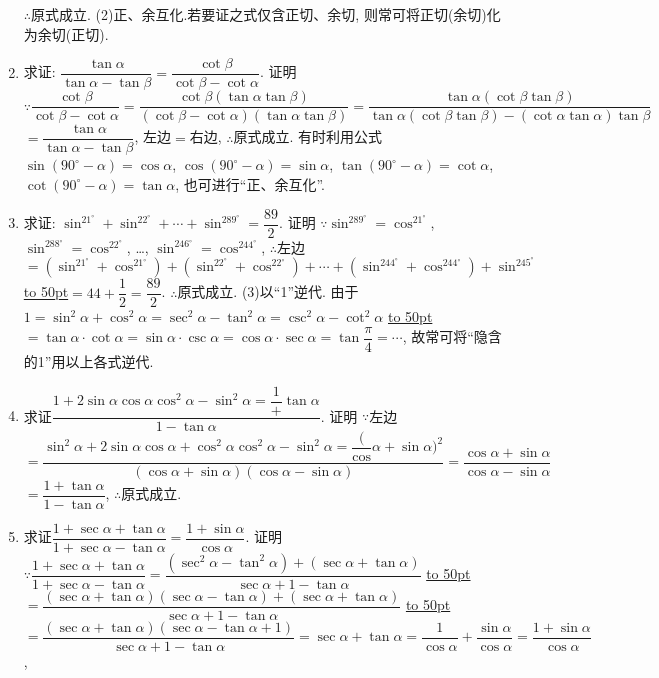 \documentclass[10pt,a4paper]{article}
\newcommand{\blank}[1]{\underline{\hbox to #1pt{}}}
\begin{document}
\begin{enumerate}[1.]
$\therefore$原式成立.
(2)正、余互化.若要证之式仅含正切、余切, 则常可将正切(余切)化为余切(正切).
\item 求证: $\dfrac{\tan \alpha }{\tan \alpha -\tan \beta }=\dfrac{\cot \beta }{\cot \beta -\cot \alpha }$.
证明  $\because \dfrac{\cot \beta }{\cot \beta -\cot \alpha }=\dfrac{\cot \beta (\tan \alpha \tan \beta)}{(\cot \beta -\cot \alpha)(\tan \alpha \tan \beta)}=\dfrac{\tan \alpha (\cot \beta \tan \beta)}{\tan \alpha (\cot \beta \tan \beta)-(\cot \alpha \tan \alpha)\tan \beta }$
$=\dfrac{\tan \alpha }{\tan \alpha -\tan \beta }$, 左边$=$右边,
$\therefore$原式成立.
有时利用公式$\sin (90^\circ -\alpha)=\cos \alpha$, $\cos (90^\circ -\alpha)=\sin \alpha$, $\tan (90^\circ -\alpha)=\cot \alpha$, $\cot (90^\circ -\alpha)=\tan \alpha$, 也可进行``正、余互化''.
\item 求证: $\sin ^21^\circ +\sin ^22^\circ +\cdots +\sin ^289^\circ =\dfrac{89}2$.
证明  $\because \sin ^289^\circ =\cos ^21^\circ$, $\sin ^288^\circ =\cos ^22^\circ$, …, $\sin ^246^\circ =\cos ^244^\circ$,
$\therefore$左边$=(\sin ^21^\circ +\cos ^21^\circ)+(\sin ^22^\circ +\cos ^22^\circ)+\cdots +(\sin ^244^\circ +\cos ^244^\circ)+\sin ^245^\circ$
\blank{50}$=44+\dfrac 12=\dfrac{89}2$.
$\therefore$原式成立.
(3)以``1''逆代.
由于$1=\sin ^2\alpha +\cos ^2\alpha =\sec ^2\alpha -\tan ^2\alpha =\csc ^2\alpha -\cot ^2\alpha$
\blank{50}$=\tan \alpha \cdot \cot \alpha =\sin \alpha \cdot \csc \alpha =\cos \alpha \cdot \sec \alpha =\tan \dfrac{\pi }4=\cdots$,
故常可将``隐含的1''用以上各式逆代.
\item 求证$\dfrac{1+2\sin \alpha \cos \alpha \cos ^2\alpha -\sin ^2\alpha =\dfrac 1+\tan \alpha }{1-\tan \alpha }$.
证明  $\because$左边$=\dfrac{\sin ^2\alpha +2\sin \alpha \cos \alpha +\cos ^2\alpha \cos ^2\alpha -\sin ^2\alpha =\dfrac (\cos \alpha +\sin \alpha)^2}{(\cos \alpha +\sin \alpha)(\cos \alpha -\sin \alpha)}=\dfrac{\cos \alpha +\sin \alpha }{\cos \alpha -\sin \alpha }$
$=\dfrac{1+\tan \alpha }{1-\tan \alpha }$,
$\therefore$原式成立.
\item 求证$\dfrac{1+\sec \alpha +\tan \alpha }{1+\sec \alpha -\tan \alpha }=\dfrac{1+\sin \alpha }{\cos \alpha }$.
证明  $\because \dfrac{1+\sec \alpha +\tan \alpha }{1+\sec \alpha -\tan \alpha }=\dfrac{(\sec ^2\alpha -\tan ^2\alpha)+(\sec \alpha +\tan \alpha)}{\sec \alpha +1-\tan \alpha }$
\blank{50}$=\dfrac{(\sec \alpha +\tan \alpha)(\sec \alpha -\tan \alpha)+(\sec \alpha +\tan \alpha)}{\sec \alpha +1-\tan \alpha }$
\blank{50}$=\dfrac{(\sec \alpha +\tan \alpha)(\sec \alpha -\tan \alpha +1)}{\sec \alpha +1-\tan \alpha }=\sec \alpha +\tan \alpha =\dfrac 1{\cos \alpha }+\dfrac{\sin \alpha }{\cos \alpha }=\dfrac{1+\sin \alpha }{\cos \alpha }$,

\end{enumerate}
\end{document}
